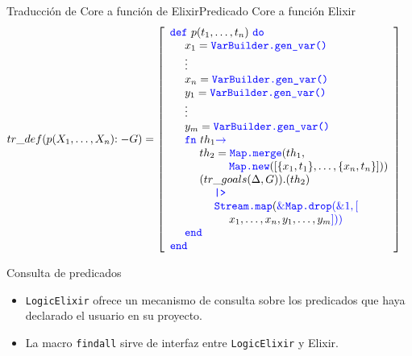 \documentclass[14pt,aspectratio=169]{beamer}
\begin{document}
\begin{frame}{Traducción de Core a función de Elixir}{Predicado Core a función Elixir}
  \scriptsize \begin{align*}
    tr\_def(p(X_1, \ldots, X_n)\mathit{:-} G) & = \left[
      \begin{array}{lrl}
        \textcolor{blue}{\texttt{def}}\,\, p(t_1, \ldots, t_n)\,\, \textcolor{blue}{\texttt{do}} \\
          \ \ \ \ x_1 = \textcolor{blue}{\texttt{VarBuilder.gen\_var()}} \\
          \ \ \ \ \vdots \\
          \ \ \ \ x_n = \textcolor{blue}{\texttt{VarBuilder.gen\_var()}} \\
          \ \ \ \ y_1 = \textcolor{blue}{\texttt{VarBuilder.gen\_var()}} \\
          \ \ \ \ \vdots \\
          \ \ \ \ y_m = \textcolor{blue}{\texttt{VarBuilder.gen\_var()}} \\
          \ \ \ \ \textcolor{blue}{\texttt{fn}}\,\, th_1 \textcolor{blue}{\rightarrow} \\
          \ \ \ \ \ \ \ \ th_2 = \textcolor{blue}{\texttt{Map.merge}}(th_1, \\
          \ \ \ \ \ \ \ \ \ \ \ \ \ \ \ \ \textcolor{blue}{\texttt{Map.new}}([\{x_1, t_1\}, \ldots, \{x_n, t_n\}])) \\
          \ \ \ \ \ \ \ \ (tr\_goals(\Delta, G)).(th_2) \\
          \ \ \ \ \ \ \ \ \ \ \ \ \textcolor{blue}{\texttt{|>}} \\
          \ \ \ \ \ \ \ \ \ \ \ \ \textcolor{blue}{\texttt{Stream.map}}(\textcolor{blue}{\&\texttt{Map.drop}(\&1, [}\\
          \ \ \ \ \ \ \ \ \ \ \ \ \ \ \ \ x_1, \ldots, x_n, y_1, \ldots, y_m\textcolor{blue}{]))}\\
          \ \ \ \ \textcolor{blue}{\texttt{end}} \\
          \textcolor{blue}{\texttt{end}}
      \end{array}
    \right]
  \end{align*}
\end{frame}

\begin{frame}{Consulta de predicados}
  \begin{itemize}
    \item \texttt{LogicElixir} ofrece un mecanismo de consulta sobre los
    predicados que haya declarado el usuario en su proyecto.
    \item La macro \texttt{findall} sirve de interfaz entre \texttt{LogicElixir}
    y Elixir.
  \end{itemize}
\end{frame}
\end{document}
